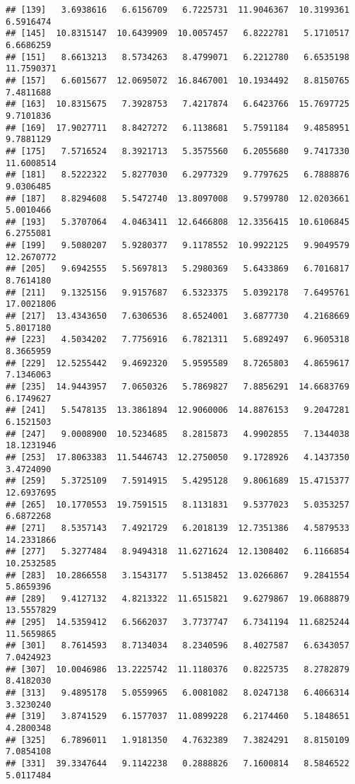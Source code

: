 \documentclass[
]{article}
\begin{document}
\begin{verbatim}
## [139]   3.6938616   6.6156709   6.7225731  11.9046367  10.3199361   6.5916474
## [145]  10.8315147  10.6439909  10.0057457   6.8222781   5.1710517   6.6686259
## [151]   8.6613213   8.5734263   8.4799071   6.2212780   6.6535198  11.7590371
## [157]   6.6015677  12.0695072  16.8467001  10.1934492   8.8150765   7.4811688
## [163]  10.8315675   7.3928753   7.4217874   6.6423766  15.7697725   9.7101836
## [169]  17.9027711   8.8427272   6.1138681   5.7591184   9.4858951   9.7881129
## [175]   7.5716524   8.3921713   5.3575560   6.2055680   9.7417330  11.6008514
## [181]   8.5222322   5.8277030   6.2977329   9.7797625   6.7888876   9.0306485
## [187]   8.8294608   5.5472740  13.8097008   9.5799780  12.0203661   5.0010466
## [193]   5.3707064   4.0463411  12.6466808  12.3356415  10.6106845   6.2755081
## [199]   9.5080207   5.9280377   9.1178552  10.9922125   9.9049579  12.2670772
## [205]   9.6942555   5.5697813   5.2980369   5.6433869   6.7016817   8.7614180
## [211]   9.1325156   9.9157687   6.5323375   5.0392178   7.6495761  17.0021806
## [217]  13.4343650   7.6306536   8.6524001   3.6877730   4.2168669   5.8017180
## [223]   4.5034202   7.7756916   6.7821311   5.6892497   6.9605318   8.3665959
## [229]  12.5255442   9.4692320   5.9595589   8.7265803   4.8659617   7.1346063
## [235]  14.9443957   7.0650326   5.7869827   7.8856291  14.6683769   6.1749627
## [241]   5.5478135  13.3861894  12.9060006  14.8876153   9.2047281   6.1521503
## [247]   9.0008900  10.5234685   8.2815873   4.9902855   7.1344038  18.1231946
## [253]  17.8063383  11.5446743  12.2750050   9.1728926   4.1437350   3.4724090
## [259]   5.3725109   7.5914915   5.4295128   9.8061689  15.4715377  12.6937695
## [265]  10.1770553  19.7591515   8.1131831   9.5377023   5.0353257   6.6872268
## [271]   8.5357143   7.4921729   6.2018139  12.7351386   4.5879533  14.2331866
## [277]   5.3277484   8.9494318  11.6271624  12.1308402   6.1166854  10.2532585
## [283]  10.2866558   3.1543177   5.5138452  13.0266867   9.2841554   5.8659396
## [289]   9.4127132   4.8213322  11.6515821   9.6279867  19.0688879  13.5557829
## [295]  14.5359412   6.5662037   3.7737747   6.7341194  11.6825244  11.5659865
## [301]   8.7614593   8.7134034   8.2340596   8.4027587   6.6343057   7.0424923
## [307]  10.0046986  13.2225742  11.1180376   0.8225735   8.2782879   8.4182030
## [313]   9.4895178   5.0559965   6.0081082   8.0247138   6.4066314   3.3230240
## [319]   3.8741529   6.1577037  11.0899228   6.2174460   5.1848651   4.2800348
## [325]   6.7896011   1.9181350   4.7632389   7.3824291   8.8150109   7.0854108
## [331]  39.3347644   9.1142238   0.2888826   7.1600814   8.5846522   5.0117484

\end{verbatim}
\end{document}
